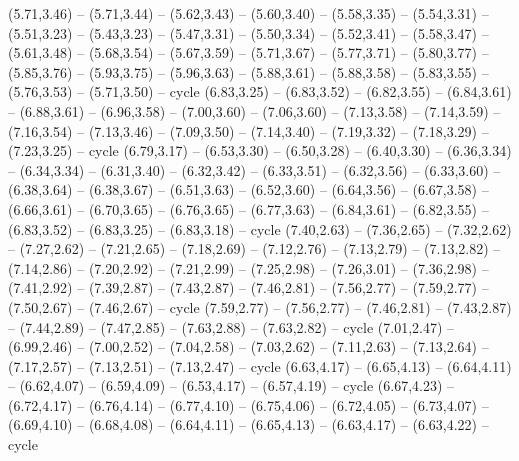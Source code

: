 \expandafter\def\csname geo:gebiet:MAR\endcsname{
  (5.71,3.46) -- (5.71,3.44) -- (5.62,3.43) -- (5.60,3.40) -- (5.58,3.35) -- (5.54,3.31) -- (5.51,3.23) -- (5.43,3.23) -- (5.47,3.31) -- (5.50,3.34) -- (5.52,3.41) -- (5.58,3.47) -- (5.61,3.48) -- (5.68,3.54) -- (5.67,3.59) -- (5.71,3.67) -- (5.77,3.71) -- (5.80,3.77) -- (5.85,3.76) -- (5.93,3.75) -- (5.96,3.63) -- (5.88,3.61) -- (5.88,3.58) -- (5.83,3.55) -- (5.76,3.53) -- (5.71,3.50) -- cycle}
\expandafter\def\csname geo:gebiet:EGY\endcsname{
  (6.83,3.25) -- (6.83,3.52) -- (6.82,3.55) -- (6.84,3.61) -- (6.88,3.61) -- (6.96,3.58) -- (7.00,3.60) -- (7.06,3.60) -- (7.13,3.58) -- (7.14,3.59) -- (7.16,3.54) -- (7.13,3.46) -- (7.09,3.50) -- (7.14,3.40) -- (7.19,3.32) -- (7.18,3.29) -- (7.23,3.25) -- cycle}
\expandafter\def\csname geo:gebiet:LBY\endcsname{
  (6.79,3.17) -- (6.53,3.30) -- (6.50,3.28) -- (6.40,3.30) -- (6.36,3.34) -- (6.34,3.34) -- (6.31,3.40) -- (6.32,3.42) -- (6.33,3.51) -- (6.32,3.56) -- (6.33,3.60) -- (6.38,3.64) -- (6.38,3.67) -- (6.51,3.63) -- (6.52,3.60) -- (6.64,3.56) -- (6.67,3.58) -- (6.66,3.61) -- (6.70,3.65) -- (6.76,3.65) -- (6.77,3.63) -- (6.84,3.61) -- (6.82,3.55) -- (6.83,3.52) -- (6.83,3.25) -- (6.83,3.18) -- cycle}
\expandafter\def\csname geo:gebiet:ETH\endcsname{
  (7.40,2.63) -- (7.36,2.65) -- (7.32,2.62) -- (7.27,2.62) -- (7.21,2.65) -- (7.18,2.69) -- (7.12,2.76) -- (7.13,2.79) -- (7.13,2.82) -- (7.14,2.86) -- (7.20,2.92) -- (7.21,2.99) -- (7.25,2.98) -- (7.26,3.01) -- (7.36,2.98) -- (7.41,2.92) -- (7.39,2.87) -- (7.43,2.87) -- (7.46,2.81) -- (7.56,2.77) -- (7.59,2.77) -- (7.50,2.67) -- (7.46,2.67) -- cycle}
\expandafter\def\csname geo:gebiet:DJI\endcsname{
  }
\expandafter\def\csname geo:gebiet:SOL\endcsname{
  (7.59,2.77) -- (7.56,2.77) -- (7.46,2.81) -- (7.43,2.87) -- (7.44,2.89) -- (7.47,2.85) -- (7.63,2.88) -- (7.63,2.82) -- cycle}
\expandafter\def\csname geo:gebiet:UGA\endcsname{
  (7.01,2.47) -- (6.99,2.46) -- (7.00,2.52) -- (7.04,2.58) -- (7.03,2.62) -- (7.11,2.63) -- (7.13,2.64) -- (7.17,2.57) -- (7.13,2.51) -- (7.13,2.47) -- cycle}
\expandafter\def\csname geo:gebiet:RWA\endcsname{
  }
\expandafter\def\csname geo:gebiet:BIH\endcsname{
  (6.63,4.17) -- (6.65,4.13) -- (6.64,4.11) -- (6.62,4.07) -- (6.59,4.09) -- (6.53,4.17) -- (6.57,4.19) -- cycle}
\expandafter\def\csname geo:gebiet:MKD\endcsname{
  }
\expandafter\def\csname geo:gebiet:SRB\endcsname{
  (6.67,4.23) -- (6.72,4.17) -- (6.76,4.14) -- (6.77,4.10) -- (6.75,4.06) -- (6.72,4.05) -- (6.73,4.07) -- (6.69,4.10) -- (6.68,4.08) -- (6.64,4.11) -- (6.65,4.13) -- (6.63,4.17) -- (6.63,4.22) -- cycle}

